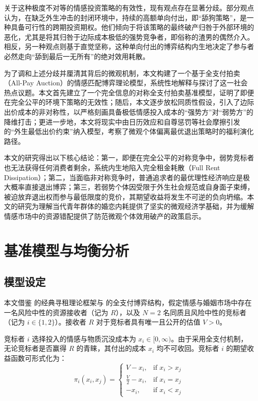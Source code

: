 \documentclass[11pt, a4paper, UTF8]{chinese-erj}
\begin{document}
关于这种极度不对等的情感投资策略的有效性，现有观点存在显著分歧。部分观点认为，在缺乏外生冲击的封闭环境中，持续的高额单向付出，即“舔狗策略”，是一种具备可行性的跨期投资期权。他们倾向于将该策略的最终破产归咎于外部环境的恶化，尤其是将其归咎于边际成本极低的强势竞争者，即俗称的渣男的偶然介入。相反，另一种观点则基于直觉坚称，这种单向付出的博弈结构内生地决定了参与者必然走向“舔到最后一无所有”的绝对效用耗散。

为了调和上述分歧并厘清其背后的微观机制，本文构建了一个基于全支付拍卖（All-Pay Auction）的情感匹配博弈理论模型，系统性地解释与探讨了这一社会热点议题。本文首先建立了一个完全信息的对称全支付拍卖基准模型，证明了即便在完全公平的环境下策略的无效性；随后，本文逐步放松同质性假设，引入了边际出价成本的非对称性，以严格刻画具备极低情感投入成本的“强势方”对“弱势方”的降维打击；更进一步地，本文将现实中由日历效应和自尊惩罚等社会摩擦引发的“外生最低出价约束”纳入模型，考察了微观个体偏离最优退出策略时的福利演化路径。

本文的研究得出以下核心结论：第一，即便在完全公平的对称竞争中，弱势竞标者也无法获得任何消费者剩余，系统内生地陷入完全租金耗散（Full Rent Dissipation）；第二，当面临非对称竞争时，普通追求者的最优理性经济响应是极大概率直接退出博弈；第三，若弱势个体因受限于外生社会规范或自身面子束缚，被迫放弃退出权而参与最低限度的竞价，其期望收益将发生不可逆的负向坍缩。本文的研究为理解当代青年群体的婚恋内耗提供了坚实的微观经济学基础，并为缓解情感市场中的资源错配提供了防范微观个体效用破产的政策启示。

\section{基准模型与均衡分析}

\subsection{模型设定}
本文借鉴 \textcite{Tullock1980} 的经典寻租理论框架与 \textcite{Baye1996} 的全支付博弈结构，假定情感与婚姻市场中存在一名风险中性的资源接收者（记为 $R$），以及 $N=2$ 名同质且风险中性的竞标者（记为 $i \in \{1, 2\}$）。接收者 $R$ 对于竞标者具有唯一且公开的估值 $V > 0$。

竞标者 $i$ 选择投入的情感与物质沉没成本为 $x_i \in [0, \infty)$。由于采用全支付机制，无论竞标者是否赢得 $R$ 的青睐，其付出的成本 $x_i$ 均不可收回。竞标者 $i$ 的期望收益函数可形式化为：
\begin{equation}
\pi_i(x_i, x_j) = 
\begin{cases} 
V - x_i, & \text{if } x_i > x_j \\
\frac{V}{2} - x_i, & \text{if } x_i = x_j \\
- x_i, & \text{if } x_i < x_j
\end{cases}
\end{equation}
\end{document}
